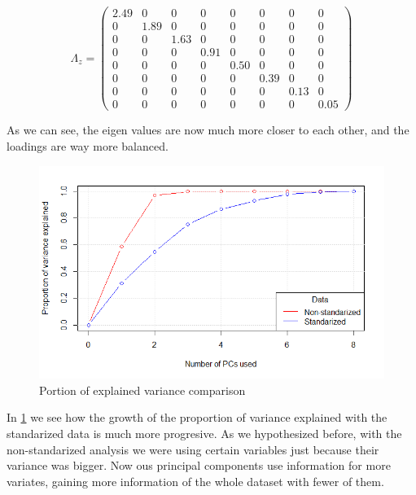 \documentclass[11pt,a4paper]{article}
\begin{document}
	 $$ \Lambda_z = 
	 \begin{pmatrix}
		2.49  & 0        & 0       & 0      & 0     & 0     & 0     & 0     \\
		0        & 1.89 & 0       & 0      & 0     & 0     & 0     & 0     \\
		0        & 0        & 1.63 & 0      & 0     & 0     & 0     & 0     \\
		0        & 0        & 0       & 0.91 & 0     & 0     & 0     & 0     \\
		0        & 0        & 0       & 0      & 0.50 & 0     & 0     & 0     \\
		0        & 0        & 0       & 0      & 0     &0.39 & 0     & 0     \\
		0        & 0        & 0       & 0      & 0     & 0     & 0.13 & 0     \\
		0        & 0        & 0       & 0      & 0     & 0     & 0     & 0.05
	 \end{pmatrix} 
	 $$ 
	 
	 As we can see, the eigen values are now much more closer to each other, and the loadings are way more balanced. 
	 
	 \begin{figure}[H] 
	 	\centering
	 	\includegraphics[scale=.9]{./pics/PCA1}
	 	\caption{Portion of explained variance comparison} \label{variance-label}
	 \end{figure}
	
	In \ref{variance-label} we see how the growth of the proportion of variance explained with the standarized data is much more progresive. As we hypothesized before, with the non-standarized analysis we were using certain variables just because their variance was bigger. Now ous principal components use information for more variates, gaining more information of the whole dataset with fewer of them. \\
	
\end{document}

